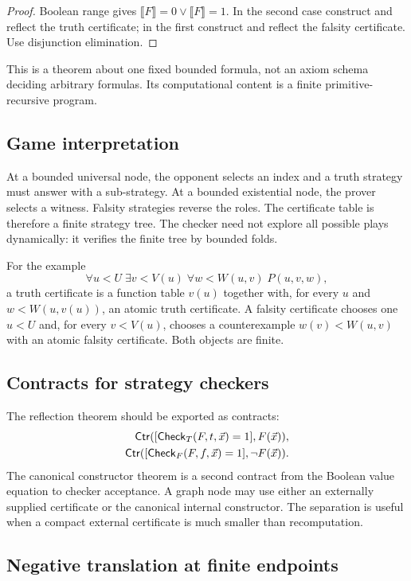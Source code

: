 \begin{proof}
Boolean range gives \(\llbracket F\rrbracket=0\vee\llbracket F\rrbracket=1\).  In the second case construct and reflect the truth certificate; in the first construct and reflect the falsity certificate.  Use disjunction elimination.
\end{proof}

This is a theorem about one fixed bounded formula, not an axiom schema deciding arbitrary formulas.  Its computational content is a finite primitive-recursive program.

\subsection{Game interpretation}

At a bounded universal node, the opponent selects an index and a truth strategy must answer with a sub-strategy.  At a bounded existential node, the prover selects a witness.  Falsity strategies reverse the roles.  The certificate table is therefore a finite strategy tree.  The checker need not explore all possible plays dynamically: it verifies the finite tree by bounded folds.

For the example
\[
 \forall u<U\;\exists v<V(u)\;\forall w<W(u,v)\;P(u,v,w),
\]
a truth certificate is a function table \(v(u)\) together with, for every \(u\) and \(w<W(u,v(u))\), an atomic truth certificate.  A falsity certificate chooses one \(u<U\) and, for every \(v<V(u)\), chooses a counterexample \(w(v)<W(u,v)\) with an atomic falsity certificate.  Both objects are finite.

\subsection{Contracts for strategy checkers}

The reflection theorem should be exported as contracts:
\begin{align*}
 \mathsf{Ctr}([\mathsf{Check}_T(F,t,\vec x)=1],F(\vec x)),\\
 \mathsf{Ctr}([\mathsf{Check}_F(F,f,\vec x)=1],\neg F(\vec x)).
\end{align*}
The canonical constructor theorem is a second contract from the Boolean value equation to checker acceptance.  A graph node may use either an externally supplied certificate or the canonical internal constructor.  The separation is useful when a compact external certificate is much smaller than recomputation.

\subsection{Negative translation at finite endpoints}

